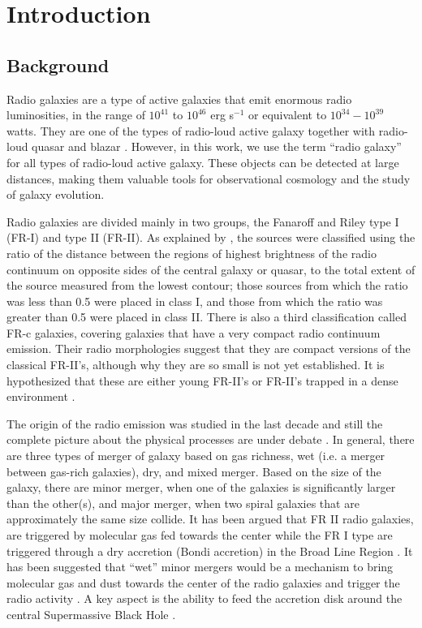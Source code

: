 
\chapter{Introduction} 

\section{Background}
Radio galaxies are a type of active galaxies that emit enormous radio luminosities, in the range of $10^{41}$ to $10^{46}$ erg s$^{-1}$ or equivalent to $10^{34}-10^{39}$ watts. They are one of the types of radio-loud active galaxy together with radio-loud quasar and blazar \citep{miley2008}. However, in this work, we use the  term ``radio galaxy'' for all types of radio-loud active galaxy. These objects can be detected at large distances, making them valuable tools for observational cosmology and the study of galaxy evolution.

Radio galaxies are divided mainly in two groups, the Fanaroff and Riley type I (FR-I) and type II (FR-II). As explained by \cite{fanaroff1974}, the sources were classified using the ratio of the distance between the regions of highest brightness of the radio continuum on opposite sides of the central galaxy or quasar, to the total extent of the source measured from the lowest contour; those sources from which the ratio was less than 0.5 were placed in class I, and those from which the ratio was greater than 0.5 were placed in class II. There is also a third classification called FR-c galaxies, covering galaxies that have a very compact radio continuum emission. Their radio morphologies suggest that they are compact versions of the classical FR-II's, although why they are so small is not yet established. It is hypothesized that these are either young FR-II's or FR-II's trapped in a dense environment \citep[e.g.][]{fanti1990, odea1991, fanti1994}.

The origin of the radio emission was studied in the last decade and still the complete picture about the physical processes are under debate \citep[e.g.][]{sikora1997, merloni2007, moderski1998}. In general, there are three types of merger of galaxy based on gas richness, wet (i.e. a merger between gas-rich galaxies), dry, and mixed merger. Based on the size of the galaxy, there are minor merger, when one of the galaxies is significantly larger than the other(s), and major merger, when two spiral galaxies that are approximately the same size collide. It has been argued that FR II radio galaxies, are triggered by molecular gas fed towards the center \citep{buttiglione2010} while the FR I type are triggered through a dry accretion (Bondi accretion) in the Broad Line Region \citep[BLR, see][]{fromerth2001}. It has been suggested that ``wet'' minor mergers would be a mechanism to bring molecular gas and dust towards the center of the radio galaxies and trigger the radio activity \citep[see, for example,][]{lim2000, israel1998}. A key aspect is the ability to feed the accretion disk around the central Supermassive Black Hole \citep[SMBH, see][]{merloni2008}.
 
